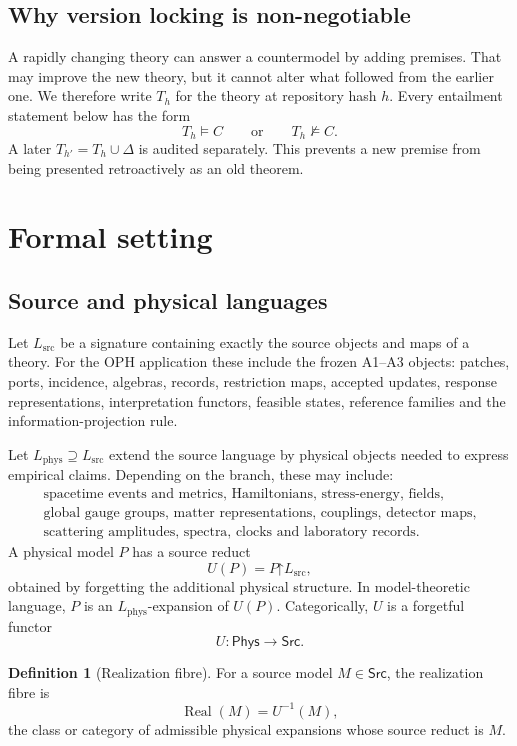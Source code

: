 \documentclass[10pt,a4paper]{article}
\theoremstyle{definition}
\newtheorem{definition}[theorem]{Definition}
\theoremstyle{remark}
\newcommand{\Lsrc}{L_{\mathrm{src}}}
\newcommand{\Lphys}{L_{\mathrm{phys}}}
\newcommand{\Phys}{\mathsf{Phys}}
\newcommand{\Src}{\mathsf{Src}}
\newcommand{\Real}{\operatorname{Real}}
\newcommand{\restr}{\mathord{\upharpoonright}}
\newcommand{\notmodels}{\mathrel{\not\models}}
\begin{document}
\subsection{Why version locking is non-negotiable}

A rapidly changing theory can answer a countermodel by adding premises.  That
may improve the new theory, but it cannot alter what followed from the earlier
one.  We therefore write \(T_h\) for the theory at repository hash \(h\).
Every entailment statement below has the form
\[
T_h\models C
\qquad\text{or}\qquad
T_h\notmodels C.
\]
A later \(T_{h'}=T_h\cup\Delta\) is audited separately.  This prevents a new
premise from being presented retroactively as an old theorem.

\section{Formal setting}
\label{sec:formalsetting}

\subsection{Source and physical languages}

Let \(\Lsrc\) be a signature containing exactly the source objects and maps of
a theory.  For the OPH application these include the frozen A1--A3 objects:
patches, ports, incidence, algebras, records, restriction maps, accepted
updates, response representations, interpretation functors, feasible states,
reference families and the information-projection rule.

Let \(\Lphys\supseteq\Lsrc\) extend the source language by physical objects
needed to express empirical claims.  Depending on the branch, these may
include:
\[
\begin{gathered}
\text{spacetime events and metrics, Hamiltonians, stress-energy, fields,}\\
\text{global gauge groups, matter representations, couplings, detector maps,}\\
\text{scattering amplitudes, spectra, clocks and laboratory records.}
\end{gathered}
\]
A physical model \(P\) has a source reduct
\[
U(P)=P\restr\Lsrc,
\]
obtained by forgetting the additional physical structure.  In model-theoretic
language, \(P\) is an \(\Lphys\)-expansion of \(U(P)\).  Categorically, \(U\)
is a forgetful functor
\[
U:\Phys\longrightarrow\Src.
\]

\begin{definition}[Realization fibre]
For a source model \(M\in\Src\), the realization fibre is
\[
\Real(M)=U^{-1}(M),
\]
the class or category of admissible physical expansions whose source reduct is
\(M\).
\end{definition}
\end{document}
